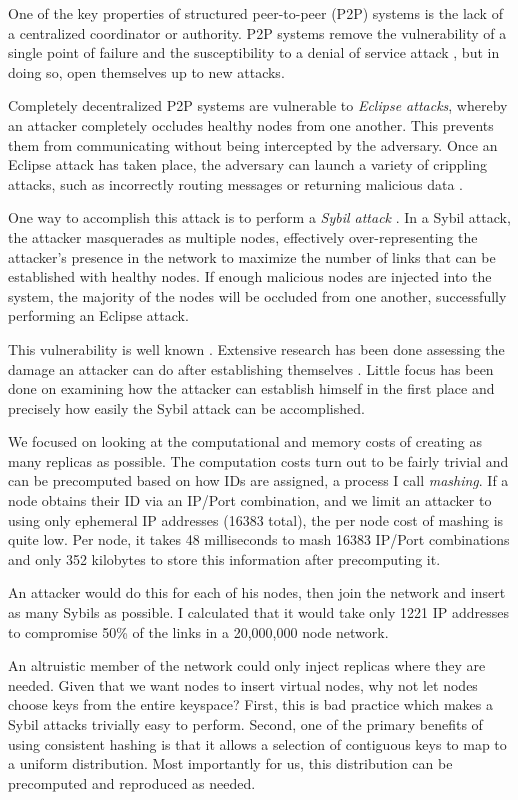 One of the key properties of structured peer-to-peer (P2P) systems is the lack of a centralized coordinator or authority.
P2P systems remove the vulnerability of a single point of failure and the susceptibility to a denial of service attack \cite{sybil}, but in doing so, open themselves up to new attacks.

Completely decentralized P2P systems are vulnerable to \textit{Eclipse attacks}, whereby an attacker completely occludes healthy nodes from one another.
This prevents them from communicating without being intercepted by the adversary.
Once an Eclipse attack has taken place, the adversary can launch a variety of crippling attacks, such as incorrectly routing messages or returning malicious data \cite{srivatsa2004vulnerabilities}.



One way to accomplish this attack is to perform a \emph{Sybil attack} \cite{sybil}.
In a Sybil attack, the attacker masquerades as multiple nodes, effectively over-representing the attacker's presence in the network to maximize the number of links that can be established with healthy nodes.
If enough malicious nodes are injected into the system, the majority of the nodes will be occluded from one another, successfully performing an Eclipse attack.

This vulnerability is well known \cite{dhtsec}. 
Extensive research has been done assessing the damage an attacker can do after establishing themselves \cite{srivatsa2004vulnerabilities}.
Little focus has been done on examining how the attacker can establish himself in the first place and precisely how easily the Sybil attack can be accomplished.

We focused on looking at the computational and memory costs of creating as many replicas as possible.
The computation costs turn out to be fairly trivial and can be precomputed based on how IDs are assigned, a process I call \textit{mashing}.
If a node obtains their ID via an IP/Port combination, and we limit an attacker to using only ephemeral IP addresses (16383 total), the per node cost of mashing is quite low.
Per node, it takes 48 milliseconds to mash 16383 IP/Port combinations and only 352 kilobytes to store this information after precomputing it.


An attacker would do this for each of his nodes, then join the network and insert as many Sybils as possible.
I calculated that it would take only 1221 IP addresses to compromise 50\% of the links in a 20,000,000 node network.

An altruistic member of the network could only inject replicas where they are needed.
Given that we want nodes to insert virtual nodes, why not let nodes choose keys from the entire keyspace?
First, this is bad practice which makes a Sybil attacks trivially easy to perform.
Second, one of the primary benefits of using consistent hashing is that it allows a selection of contiguous keys to map to a uniform distribution.
Most importantly for us, this distribution can be precomputed and reproduced as needed. 
